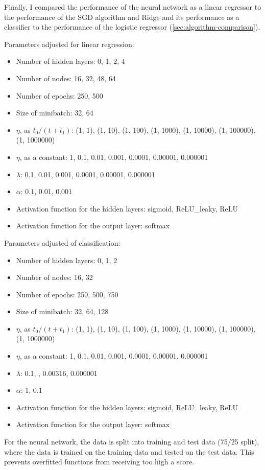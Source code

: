 \documentclass[a4paper, UKenglish]{article}
\newcommand{\0}{\mathbf{0}}
\newcommand{\1}{\mathbf{1}}
\begin{document}
Finally, I compared the performance of the neural network as a linear regressor to the performance of the SGD algorithm and Ridge and its performance as a classifier to the performance of the logistic regressor (\autoref{sec:algorithm-comparison}).

Parameters adjusted for linear regression:
\begin{itemize}
\item Number of hidden layers: 0, 1, 2, 4
\item Number of nodes: 16, 32, 48, 64
\item Number of epochs: 250, 500
\item Size of minibatch: 32, 64
\item $\eta$, as $t_0/(t+t_1)$: (1, 1), (1, 10), (1, 100), (1, 1000), (1, 10000),  (1, 100000), (1, 1000000)
\item $\eta$, as a constant: 1, 0.1, 0.01, 0.001, 0.0001, 0.00001, 0.000001
\item $\lambda$: 0.1, 0.01, 0.001, 0.0001, 0.00001, 0.000001
\item $\alpha$: 0.1, 0.01, 0.001
\item Activation function for the hidden layers: sigmoid, ReLU\_leaky, ReLU
\item Activation function for the output layer: softmax
\end{itemize}

Parameters adjusted of classification:
\begin{itemize}
\item Number of hidden layers: 0, 1, 2
\item Number of nodes: 16, 32
\item Number of epochs: 250, 500, 750
\item Size of minibatch: 32, 64, 128
\item $\eta$, as $t_0/(t+t_1)$: (1, 1), (1, 10), (1, 100), (1, 1000), (1, 10000),  (1, 100000), (1, 1000000)
\item $\eta$, as a constant: 1, 0.1, 0.01, 0.001, 0.0001, 0.00001, 0.000001
\item $\lambda$: 0.1, , 0.00316, 0.000001
\item $\alpha$: 1, 0.1
\item Activation function for the hidden layers: sigmoid, ReLU\_leaky, ReLU
\item Activation function for the output layer: softmax
\end{itemize}


For the neural network, the data is split into training and test data (75/25 split), where the data is trained on the training data and tested on the test data. This prevents overfitted functions from receiving too high a score.
\end{document}
